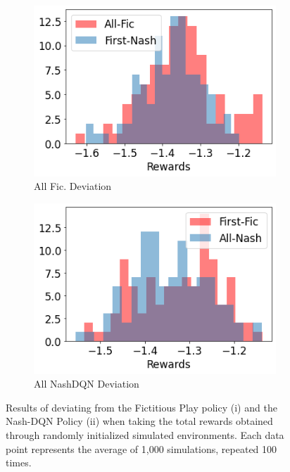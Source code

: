 \documentclass[onefignum,onetabnum]{siamonline171218}
\begin{document}
\begin{figure}[t!]
\centering
\begin{subfigure}{.45\textwidth}
  \centering
  \includegraphics[width=1\linewidth]{Figures/Histo_c100_allfic.jpg}
  \caption{All Fic. Deviation}
\end{subfigure}%
\begin{subfigure}{.45\textwidth}
  \centering
  \includegraphics[width=1\linewidth]{Figures/Histo_c100_allNash.jpg}
  \caption{All NashDQN Deviation}
\end{subfigure}
\caption{Results of deviating from the Fictitious Play policy (i) and the Nash-DQN Policy (ii) when taking the total rewards obtained through randomly initialized simulated environments. Each data point represents the average of 1,000 simulations, repeated 100 times.
\label{fig:HistoResults}}
\end{figure}
\end{document}
